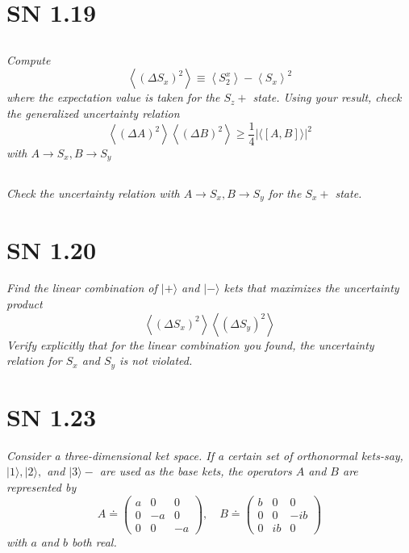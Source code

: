 \documentclass{article}
\begin{document}
\newpage

\section{SN 1.19}


\subsection{}
\textit{Compute
$$
\left\langle\left(\Delta S_{x}\right)^{2}\right\rangle \equiv\left\langle S_{2}^{x}\right\rangle-\left\langle S_{x}\right\rangle^{2}
$$
where the expectation value is taken for the $S_{z}+$ state. Using your result, check the generalized uncertainty relation
$$
\left\langle(\Delta A)^{2}\right\rangle\left\langle(\Delta B)^{2}\right\rangle \geq \frac{1}{4}|\langle[A, B]\rangle|^{2}
$$
with $A \rightarrow S_{x}, B \rightarrow S_{y}$}


\subsection{}
\textit{Check the uncertainty relation with $A \rightarrow S_{x}, B \rightarrow S_{y}$ for the $S_{x}+$ state.}

\newpage
\section{SN 1.20}
\textit{Find the linear combination of $|+\rangle$ and $|-\rangle$ kets that maximizes the uncertainty product
$$
\left\langle\left(\Delta S_{x}\right)^{2}\right\rangle\left\langle\left(\Delta S_{y}\right)^{2}\right\rangle
$$
Verify explicitly that for the linear combination you found, the uncertainty relation for $S_{x}$ and $S_{y}$ is not violated.}


\newpage

\section{SN 1.23}
\textit{Consider a three-dimensional ket space. If a certain set of orthonormal kets-say, $|1\rangle,|2\rangle,$ and $|3\rangle-$ are used as the base kets, the operators $A$ and $B$ are represented by
$$
A \doteq\left(\begin{array}{ccc}
a & 0 & 0 \\
0 & -a & 0 \\
0 & 0 & -a
\end{array}\right), \quad B \doteq\left(\begin{array}{ccc}
b & 0 & 0 \\
0 & 0 & -i b \\
0 & i b & 0
\end{array}\right)
$$ with $a$ and $b$ both real.}
\end{document}
